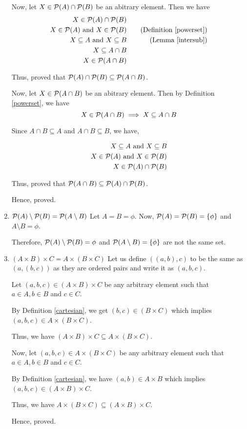 \begin{enumerate}
				Now, let $X \in \mathcal{P}(A) \cap \mathcal{P}(B)$ be an abitrary element. Then we have 
				\begin{align}
					X \in \mathcal{P}(A) \cap \mathcal{P}(B) \\
					X \in \mathcal{P}(A) \text{ and } X \in \mathcal{P}(B) && \quad \text{(Definition \ref{powerset})}\\
					X \subseteq A \text{ and } X \subseteq B && \quad \text{(Lemma \ref{intersub})} \\
					X \subseteq A \cap B \\
					X \in \mathcal{P}(A \cap B)
				\end{align}

				Thus, proved that $\mathcal{P}(A) \cap \mathcal{P}(B) \subseteq \mathcal{P}(A \cap B)$.

				Now, let $X \in \mathcal{P}(A \cap B)$ be an abitrary element. Then by Definition \ref{powerset}, we have
				$$X \in \mathcal{P}(A \cap B) \implies X \subseteq A \cap B$$

				Since $A \cap B \subseteq A$ and $A \cap B \subseteq B$, we have,

				\begin{align}
					X \subseteq A \text{ and } X \subseteq B \\
					X \in \mathcal{P}(A) \text{ and } X \in \mathcal{P}(B) \\
					X \in \mathcal{P}(A) \cap \mathcal{P}(B)
				\end{align}

				Thus, proved that $\mathcal{P}(A \cap B) \subseteq \mathcal{P}(A) \cap \mathcal{P}(B)$.

				Hence, proved.
			\es

		\item $\mathcal{P}(A) \setminus \mathcal{P}(B) = \mathcal{P}(A \setminus B)$
			\bs
				Let $A = B = \phi$. Now, $\mathcal{P}(A) = \mathcal{P}(B) = \{\phi\}$ and $A \setminus B = \phi$.

				Therefore, $\mathcal{P}(A) \setminus \mathcal{P}(B) = \phi$ and $\mathcal{P}(A \setminus B) = \{\phi\}$ are not the same set.
			\es

		\item $(A \times B) \times C = A \times (B \times C)$
			\bs
				Let us define $((a, b), c)$ to be the same as $(a, (b, c))$ as they are ordered pairs and write it as $(a, b, c)$.
				
				Let $(a, b, c) \in (A \times B) \times C$ be any arbitrary element such that $a \in A, b \in B$ and $c \in C$. 

				By Definition \ref{cartesian}, we get $(b, c) \in (B \times C)$ which implies $(a, b, c) \in A \times (B \times C)$.

				Thus, we have $(A \times B) \times C \subseteq A \times (B \times C)$.


				Now, let $(a, b, c) \in A \times (B \times C)$ be any arbitrary element such that $a \in A, b \in B$ and $c \in C$.

				By Definition \ref{cartesian}, we have $(a, b) \in A \times B$ which implies $(a, b, c) \in (A \times B) \times C$.

				Thus, we have $A \times (B \times C) \subseteq (A \times B) \times C$.

				Hence, proved.
			\es
	\end{enumerate}
\ep 


